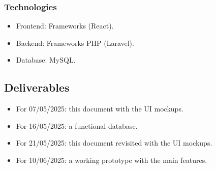 \subsubsection{Technologies}
\begin{itemize}
    \item Frontend: Frameworks (React).
    \item Backend: Frameworks PHP (Laravel).
    \item Database: MySQL.
\end{itemize}

\subsection{Deliverables}
\begin{itemize}
    \item For 07/05/2025: this document with the UI mockups.
    \item For 16/05/2025: a functional database.
    \item For 21/05/2025: this document revisited with the UI mockups.
    \item For 10/06/2025: a working prototype with the main features.
\end{itemize}
